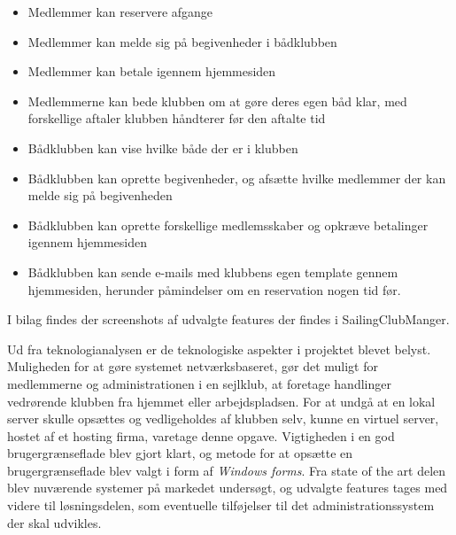 \begin{itemize}
  \item Medlemmer kan reservere afgange
  \item Medlemmer kan melde sig på begivenheder i bådklubben
  \item Medlemmer kan betale igennem hjemmesiden
  \item Medlemmerne kan bede klubben om at gøre deres egen båd klar, med forskellige aftaler klubben håndterer
        før den aftalte tid
  \item Bådklubben kan vise hvilke både der er i klubben
  \item Bådklubben kan oprette begivenheder, og afsætte hvilke medlemmer der kan melde sig på begivenheden
  \item Bådklubben kan oprette forskellige medlemsskaber og opkræve betalinger igennem hjemmesiden
  \item Bådklubben kan sende e-mails med klubbens egen template gennem hjemmesiden, herunder påmindelser om en
        reservation nogen tid før.
\end{itemize}

I bilag  findes der screenshots af udvalgte features der findes i SailingClubManger.


Ud fra teknologianalysen er de teknologiske aspekter i projektet blevet belyst. Muligheden for at gøre
systemet netværksbaseret, gør det muligt for medlemmerne og administrationen i en sejlklub, at foretage
handlinger vedrørende klubben fra hjemmet eller arbejdspladsen. For at undgå at en lokal server skulle
opsættes og vedligeholdes af klubben selv, kunne en virtuel server, hostet af et hosting firma, varetage denne
opgave. Vigtigheden i en god brugergrænseflade blev gjort klart, og metode for at opsætte en brugergrænseflade
blev valgt i form af \textit{Windows forms}. Fra state of the art delen blev nuværende systemer på markedet
undersøgt, og udvalgte features tages med videre til løsningsdelen, som eventuelle tilføjelser til det
administrationssystem der skal udvikles.


